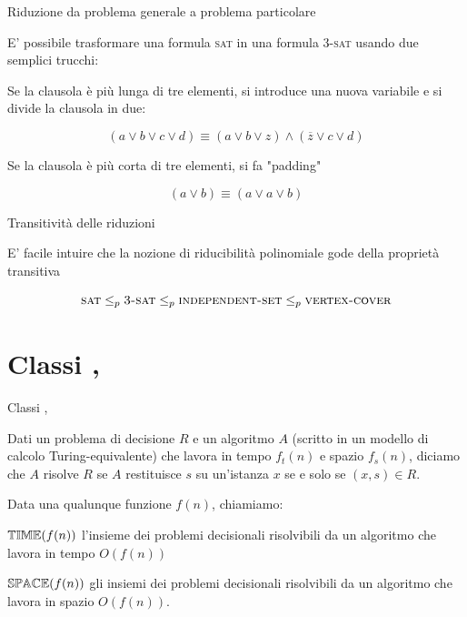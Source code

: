 \begin{frame}{Riduzione da problema generale a problema particolare}


\bigskip
{}

\pause
\smallskip
E' possibile trasformare una formula \textsc{sat} in una formula \textsc{3-sat} usando due semplici trucchi:
\BIL
\item Se la clausola è più lunga di tre elementi, si introduce una nuova variabile e si divide la clausola in due:

\[
  (a \vee b \vee c \vee d) \equiv (a \vee b \vee z) \wedge (\overline{z} \vee c \vee d)
\]
\item Se la clausola è più corta di tre elementi, si fa "padding"

\[
  (a \vee b) \equiv (a \vee a \vee b)
\]
\EIL

\end{frame}

\begin{frame}{Transitività delle riduzioni}

E' facile intuire che la nozione di riducibilità polinomiale gode della
proprietà transitiva

\[
  \textsc{sat} \leq_p \textsc{3-sat} \leq_p \textsc{independent-set} \leq_p \textsc{vertex-cover}
\]

\end{frame}



\section{Classi \PTIME, \PSPACE}

\begin{frame}{Classi \PTIME, \PSPACE}

\vspace{-9pt}
\begin{myboxtitle}[Algoritmo]
Dati un problema di decisione $R$ e un algoritmo $A$ (scritto in un modello di calcolo Turing-equivalente)
che lavora in tempo $f_t(n)$ e spazio $f_s(n)$, diciamo che $A$ 
risolve $R$ se $A$ restituisce $s$ su un'istanza $x$ 
se e solo se $(x,s) \in R$.
\end{myboxtitle}

\begin{myboxtitle}
Data una qualunque funzione $f(n)$, chiamiamo:
\BIL
\item \alert{$\mbox{$\mathbb{TIME}$}(f(n))$} l'insieme dei problemi decisionali
 risolvibili da un algoritmo che lavora in tempo $O(f(n))$
\item \alert{$\mbox{$\mathbb{SPACE}$}(f(n))$} gli insiemi dei problemi 
decisionali risolvibili da un algoritmo che lavora  in spazio $O(f(n))$.
\EIL
\end{myboxtitle}

\end{frame}

